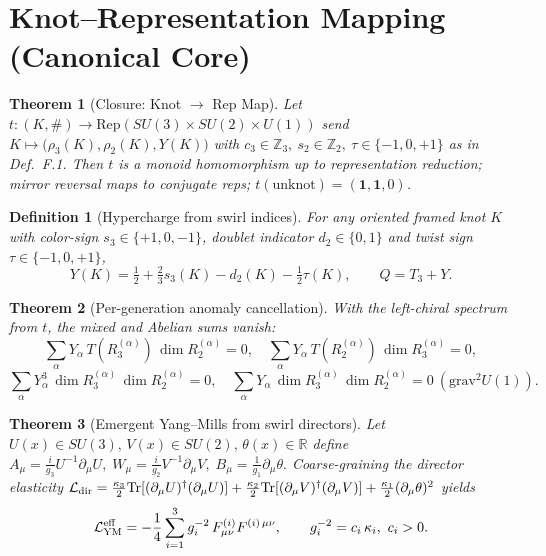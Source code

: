 \documentclass[11pt]{article}
\newtheorem{theorem}{Theorem}[section]
\newtheorem{definition}{Definition}[section]
\begin{document}
\section{Knot–Representation Mapping (Canonical Core)}
\begin{theorem}[Closure: Knot $\to$ Rep Map]
	Let $t:(K,\#)\to \mathrm{Rep}(SU(3)\times SU(2)\times U(1))$ send
	$K\mapsto\big(\rho_3(K),\rho_2(K),Y(K)\big)$ with
	$c_3\in\mathbb{Z}_3,\ s_2\in\mathbb{Z}_2,\ \tau\in\{-1,0,+1\}$ as in Def.~F.1.
	Then $t$ is a monoid homomorphism up to representation reduction; mirror reversal maps to conjugate reps; $t(\text{unknot})=(\mathbf{1},\mathbf{1},0)$.
\end{theorem}

\begin{definition}[Hypercharge from swirl indices]
	For any oriented framed knot $K$ with color-sign $s_3\in\{+1,0,-1\}$,
	doublet indicator $d_2\in\{0,1\}$ and twist sign $\tau\in\{-1,0,+1\}$,
	\[
		Y(K)=\tfrac{1}{2}+\tfrac{2}{3}s_3(K)-d_2(K)-\tfrac{1}{2}\tau(K),
		\qquad Q=T_3+Y .
	\]
\end{definition}

\begin{theorem}[Per-generation anomaly cancellation]
	With the left-chiral spectrum from $t$, the mixed and Abelian sums vanish:
	\[
		\sum_\alpha Y_\alpha\,T(R^{(\alpha)}_3)\,\dim R^{(\alpha)}_2=0,\quad
		\sum_\alpha Y_\alpha\,T(R^{(\alpha)}_2)\,\dim R^{(\alpha)}_3=0,
	\]
	\[
		\sum_\alpha Y_\alpha^3\,\dim R^{(\alpha)}_3\,\dim R^{(\alpha)}_2=0,\quad
		\sum_\alpha Y_\alpha\,\dim R^{(\alpha)}_3\,\dim R^{(\alpha)}_2=0\ (\text{grav}^2U(1)).
	\]
\end{theorem}

\begin{theorem}[Emergent Yang--Mills from swirl directors]
	Let $U(x)\in SU(3),\,V(x)\in SU(2),\,\theta(x)\in\mathbb{R}$ define
	\(
	A_\mu=\frac{i}{g_3}U^{-1}\partial_\mu U,\;
	W_\mu=\frac{i}{g_2}V^{-1}\partial_\mu V,\;
	B_\mu=\frac{1}{g_1}\partial_\mu\theta.
	\)
	Coarse-graining the director elasticity
	\(
	\mathcal{L}_{\rm dir}=\tfrac{\kappa_3}{2}\mathrm{Tr}[(\partial_\mu U)^\dagger(\partial_\mu U)]
	+\tfrac{\kappa_2}{2}\mathrm{Tr}[(\partial_\mu V)^\dagger(\partial_\mu V)]
	+\tfrac{\kappa_1}{2}(\partial_\mu\theta)^2
	\)
	yields
	\[
		\mathcal{L}_{\rm YM}^{\rm eff}=-\frac{1}{4}\sum_{i=1}^3 g_i^{-2}\,F^{(i)}_{\mu\nu}F^{(i)\,\mu\nu},
		\qquad g_i^{-2}=c_i\,\kappa_i,\ c_i>0.
	\]
\end{theorem}
\end{document}
